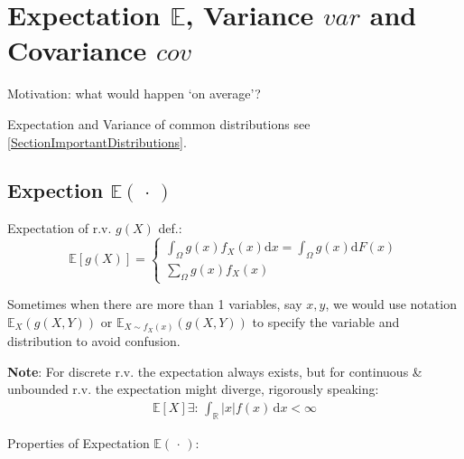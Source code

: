 \section{Expectation $\mathbb{E}$, Variance $var$ and Covariance $cov$}
Motivation: what would happen `on average'?

Expectation and Variance of common distributions see \autoref{SectionImportantDistributions}.

\subsection{Expection $ \mathbb{E}(\,\cdot\,) $}
    Expectation of r.v. $g(X)$ def.:
    \begin{equation}
    \mathbb{E} [g(X)]=\begin{cases}
        {\displaystyle\int_\Omega g(x) f_X(x)\mathrm{d}x=\int_\Omega g(x)\mathrm{d}F(x)}\\
        {\displaystyle\sum_{\Omega}g(x)f_X(x)}
    \end{cases}
\end{equation}

    Sometimes when there are more than 1 variables, say $ x,y $, we would use notation $ \mathbb{E}_{X}\left( g(X,Y) \right)  $ or $ \mathbb{E}_{X\sim f_X(x)}\left( g(X,Y) \right)  $ to specify the variable and distribution to avoid confusion.

    \textbf{Note}: For discrete r.v. the expectation always exists, but for continuous \& unbounded r.v. the expectation might diverge, rigorously speaking:
    \begin{align}
        \mathbb{E}\left[ X \right]\exists:\, \int_{\mathbb{R}}|x|f(x)\,\mathrm{d}x<\infty  
    \end{align}
    
    
 
\begin{point}
    Properties of Expectation $\mathbb{E}(\,\cdot\,)$:
\end{point}

